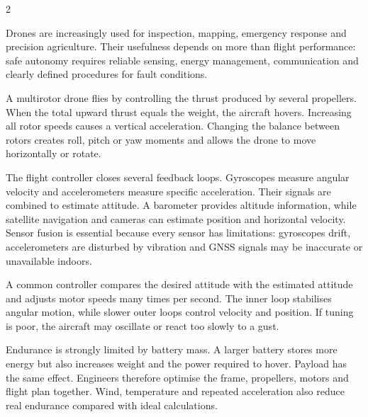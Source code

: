

\begin{multicols}{2}
\begin{engineeringnews}
Drones are increasingly used for inspection, mapping, emergency response and precision agriculture.
Their usefulness depends on more than flight performance: safe autonomy requires reliable sensing,
energy management, communication and clearly defined procedures for fault conditions.
\end{engineeringnews}

\begin{ecarticle}
A multirotor drone flies by controlling the thrust produced by several propellers. When the total
upward thrust equals the weight, the aircraft hovers. Increasing all rotor speeds causes a vertical
acceleration. Changing the balance between rotors creates roll, pitch or yaw moments and allows the
drone to move horizontally or rotate.

The flight controller closes several feedback loops. Gyroscopes measure angular velocity and
accelerometers measure specific acceleration. Their signals are combined to estimate attitude. A
barometer provides altitude information, while satellite navigation and cameras can estimate
position and horizontal velocity. Sensor fusion is essential because every sensor has limitations: gyroscopes drift,
accelerometers are disturbed by vibration and GNSS signals may be inaccurate or unavailable indoors.

A common controller compares the desired attitude with the estimated attitude and adjusts motor
speeds many times per second. The inner loop stabilises angular motion, while slower outer loops
control velocity and position. If tuning is poor, the aircraft may oscillate or react too slowly to a
gust.

Endurance is strongly limited by battery mass. A larger battery stores more energy but also increases
weight and the power required to hover. Payload has the same effect. Engineers therefore optimise the
frame, propellers, motors and flight plan together. Wind, temperature and repeated acceleration also
reduce real endurance compared with ideal calculations.


\end{ecarticle}
\end{multicols}
